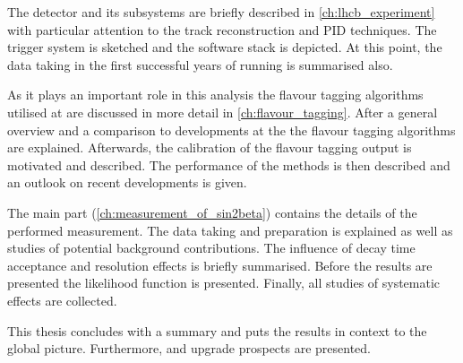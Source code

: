 The \LHCb detector and its subsystems are briefly described in
\cref{ch:lhcb_experiment} with particular attention to the track reconstruction
and \acl{PID} techniques. The \LHCb trigger system is sketched and the software
stack is depicted. At this point, the data taking in the first successful years
of running is summarised also.

As it plays an important role in this analysis the flavour tagging algorithms
utilised at \LHCb are discussed in more detail in \cref{ch:flavour_tagging}.
After a general overview and a comparison to developments at the \BFactories the
flavour tagging algorithms are explained. Afterwards, the calibration of the
flavour tagging output is motivated and described. The performance of the
methods is then described and an outlook on recent developments is given.

The main part (\cref{ch:measurement_of_sin2beta}) contains the details of the
performed measurement. The data taking and preparation is explained as well as
studies of potential background contributions. The influence of decay time
acceptance and resolution effects is briefly summarised. Before the results are
presented the likelihood function is presented. Finally, all studies of
systematic effects are collected.

This thesis concludes with a summary and puts the results in context to the
global \CKM picture. Furthermore, \RunTwo and \LHCb upgrade prospects are
presented.
